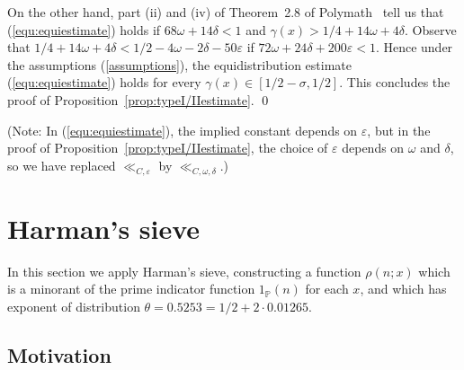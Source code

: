 \documentclass{amsart}
\numberwithin{equation}{section}
\begin{document}
\vspace{3mm}
 On the other hand, part (ii) and (iv) of Theorem~2.8 of Polymath~\cite{Polymath:2014:EDZ} tell us that (\ref{equ:equiestimate}) holds if $68\omega + 14 \delta<1$ and $\gamma(x)>1/4+14\omega + 4 \delta    $. Observe that $1/4+14\omega + 4 \delta < 1/2-4\omega-2\delta-50\varepsilon$ if $72\omega + 24\delta +200\varepsilon < 1$.  Hence under the assumptions (\ref{assumptions}), the equidistribution estimate (\ref{equ:equiestimate}) holds for every $\gamma(x) \in [1/2-\sigma,1/2]$.  This  concludes the proof of Proposition~\ref{prop:typeI/IIestimate}. \qed

\vspace{3mm}
(Note: In (\ref{equ:equiestimate}), the implied constant depends on $\varepsilon$, but in the proof of Proposition~\ref{prop:typeI/IIestimate}, the choice of $\varepsilon$ depends on $\omega$ and $\delta$, so we have  replaced $\ll_{C,\varepsilon}$ by $\ll_{C, \omega,\delta}$.)

 



\section{Harman's sieve} \label{sec:harman}

 
In this section we apply Harman's sieve, constructing a function $\rho(n;x) $ which is a minorant of the prime indicator function $1_{\mathbb{P}}(n)$ for each $x$,  and which has exponent of distribution $\theta = 0.5253 =1/2 + 2 \cdot 0.01265$. 

\subsection{Motivation} 
\end{document}
